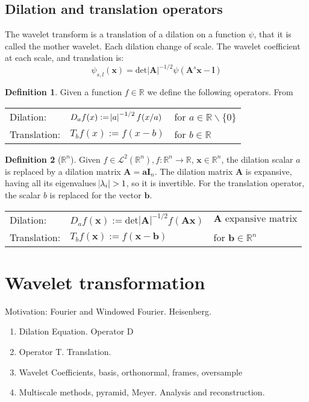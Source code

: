 \documentclass{InsightArticle}
\theoremstyle{definition}
\newtheorem{definition}{Definition}[section]
\begin{document}
\subsection{Dilation and translation operators}
The wavelet transform is a translation of a dilation on a function $\psi$, that it is called the mother wavelet. Each dilation change of scale. The wavelet coefficient at each scale, and translation is:
\begin{equation}
  \psi_{s,l}(\bm{x}) = \text{det}|\bm{A}|^{-1/2}\psi(\bm{A}^s\bm{x} - \bm{l})
\end{equation}

\begin{definition}
  Given a function $f \in \mathbb{R}$ we define the following operators. From \cite{heil_continuous_1989} \par
  \begin{tabular}{lll}
    Dilation:&  $D_a f(x):=\abs{a}^{-1/2}f(x/a)$ &for $a \in \mathbb{R}\backslash\{0\}$ \\
    Translation:&   $T_b f(x):=f(x-b)$ &for $b \in \mathbb{R}$ \\
  \end{tabular}
\end{definition}

\begin{definition}[$\mathbb{R}^n$]
  Given $f \in \mathcal{L}^2(\mathbb{R}^n), f:\mathbb{R}^n \rightarrow \mathbb{R}$, $\bm{x}\in\mathbb{R}^n$, the dilation scalar $a$ is replaced by a dilation matrix $\bm{A} = \bm{a} \bm{I}_n$. The dilation matrix $\bm{A}$ is expansive, having all its eigenvalues $\abs{\lambda_i} > 1$, so it is invertible. For the translation operator, the scalar $b$ is replaced for the vector $\bm{b}$.\\
  \begin{tabular}{lll}
    Dilation:& $D_a f(\bm{x}):=\text{det}|\bm{A}|^{-1/2}f(\bm{A}\bm{x})$ &$\bm{A} \text{ expansive matrix}$\\
    Translation:&   $T_b f(\bm{x}):=f(\bm{x}-\bm{b})$ &for $\bm{b} \in \mathbb{R}^n$ \\
  \end{tabular}
\end{definition}

\section{Wavelet transformation}
Motivation: Fourier and Windowed Fourier. Heisenberg.
\begin{enumerate}
  \item Dilation Equation. Operator D
  \item Operator T. Translation.
  \item Wavelet Coefficients, basis, orthonormal, frames, oversample
  \item Multiscale methods, pyramid, Meyer. Analysis and reconstruction.
\end{enumerate}
\end{document}
